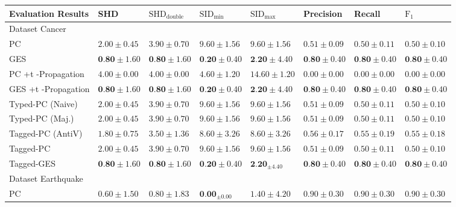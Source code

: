 \documentclass[10pt]{article}
\begin{document}
\begin{center}
\begin{tabular}{|l|l|l|l|l|l|l|l|}
\hline
Evaluation Results & SHD & $\mathrm{SHD}_{\text {double }}$ & $\mathrm{SID}_{\text {min }}$ & $\mathrm{SID}_{\text {max }}$ & Precision & Recall & $\mathrm{F}_{1}$ \\
\hline
Dataset Cancer &  &  &  &  &  &  &  \\
\hline
PC & $2.00 \pm 0.45$ & $3.90 \pm 0.70$ & $9.60 \pm 1.56$ & $9.60 \pm 1.56$ & $0.51 \pm 0.09$ & $0.50 \pm 0.11$ & $0.50 \pm 0.10$ \\
\hline
GES & $\mathbf{0 . 8 0} \pm 1.60$ & $\mathbf{0 . 8 0} \pm 1.60$ & $\mathbf{0 . 2 0} \pm 0.40$ & $\mathbf{2 . 2 0} \pm 4.40$ & $\mathbf{0 . 8 0} \pm 0.40$ & $\mathbf{0 . 8 0} \pm 0.40$ & $\mathbf{0 . 8 0} \pm 0.40$ \\
\hline
PC +t -Propagation & $4.00 \pm 0.00$ & $4.00 \pm 0.00$ & $4.60 \pm 1.20$ & $14.60 \pm 1.20$ & $0.00 \pm 0.00$ & $0.00 \pm 0.00$ & $0.00 \pm 0.00$ \\
\hline
GES +t -Propagation & $\mathbf{0 . 8 0} \pm 1.60$ & $\mathbf{0 . 8 0} \pm 1.60$ & $\mathbf{0 . 2 0} \pm 0.40$ & $\mathbf{2 . 2 0} \pm 4.40$ & $\mathbf{0 . 8 0} \pm 0.40$ & $\mathbf{0 . 8 0} \pm 0.40$ & $\mathbf{0 . 8 0} \pm 0.40$ \\
\hline
Typed-PC (Naive) & $2.00 \pm 0.45$ & $3.90 \pm 0.70$ & $9.60 \pm 1.56$ & $9.60 \pm 1.56$ & $0.51 \pm 0.09$ & $0.50 \pm 0.11$ & $0.50 \pm 0.10$ \\
\hline
Typed-PC (Maj.) & $2.00 \pm 0.45$ & $3.90 \pm 0.70$ & $9.60 \pm 1.56$ & $9.60 \pm 1.56$ & $0.51 \pm 0.09$ & $0.50 \pm 0.11$ & $0.50 \pm 0.10$ \\
\hline
Tagged-PC (AntiV) & $1.80 \pm 0.75$ & $3.50 \pm 1.36$ & $8.60 \pm 3.26$ & $8.60 \pm 3.26$ & $0.56 \pm 0.17$ & $0.55 \pm 0.19$ & $0.55 \pm 0.18$ \\
\hline
Tagged-PC & $2.00 \pm 0.45$ & $3.90 \pm 0.70$ & $9.60 \pm 1.56$ & $9.60 \pm 1.56$ & $0.51 \pm 0.09$ & $0.50 \pm 0.11$ & $0.50 \pm 0.10$ \\
\hline
Tagged-GES & $\mathbf{0 . 8 0} \pm 1.60$ & $\mathbf{0 . 8 0} \pm 1.60$ & $\mathbf{0 . 2 0} \pm 0.40$ & $\mathbf{2 . 2 0}_{ \pm 4.40}$ & $\mathbf{0 . 8 0} \pm 0.40$ & $\mathbf{0 . 8 0} \pm 0.40$ & $\mathbf{0 . 8 0} \pm 0.40$ \\
\hline
Dataset Earthquake & \multicolumn{7}{|c|}{} \\
\hline
PC & $0.60 \pm 1.50$ & $0.80 \pm 1.83$ & $\mathbf{0 . 0 0}_{ \pm 0.00}$ & $1.40 \pm 4.20$ & $0.90 \pm 0.30$ & $0.90 \pm 0.30$ & $0.90 \pm 0.30$ \\

\end{tabular}
\end{center}
\end{document}
